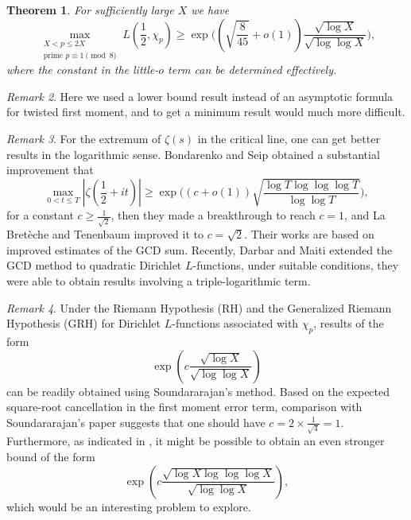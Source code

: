 \documentclass[12pt,reqno]{amsart}
\numberwithin{equation}{section}
\theoremstyle{plain}
\newtheorem{theorem}{Theorem}[section]
\theoremstyle{definition}
\theoremstyle{remark}
\newtheorem{remark}[theorem]{Remark}
\begin{document}
\begin{theorem}\label{thm1}
For sufficiently large $X$ we have
\begin{equation*}
  \max_{\substack{X< p\leq 2X\\\textrm{prime }p\equiv 1\pmod 8}}
  L(\frac{1}{2},\chi_p)
  \geq
\exp\Big((\sqrt{\frac{8}{45}}+o(1))\frac{\sqrt{\log X}}{\sqrt{\log\log X}}\Big),
\end{equation*}
where the constant in the little-$o$ term can be determined effectively.
\end{theorem}

\begin{remark}
  Here we used a lower bound result instead of an asymptotic formula for twisted first moment, and to get a minimum result would much more difficult.
\end{remark}

\begin{remark}
For the extremum of $\zeta(s)$ in the critical line, one can get better results in the logarithmic sense. Bondarenko and Seip\cite{BS17} obtained a substantial improvement that
\begin{equation*}
  \max_{0<t\leq T}|\zeta(\frac{1}{2}+it)|
  \geq \exp\Big(
  (c+o(1))\sqrt{\frac{\log T \log\log\log T}{\log \log T}}
  \Big),
\end{equation*}
for a constant $c\geq \frac{1}{\sqrt{2}}$,
then they made a breakthrough\cite{BS18} to reach $c = 1$, and La Bret\`eche and Tenenbaum\cite{dT19} improved it to $c=\sqrt{2}$.
Their works are based on improved estimates of the GCD sum.
Recently, Darbar and Maiti\cite{DM24,DM25} extended the GCD method to quadratic Dirichlet \( L \)-functions, under suitable conditions, they were able to obtain results involving a triple-logarithmic term.
\end{remark}

\begin{remark}
Under the Riemann Hypothesis (RH) and the Generalized Riemann Hypothesis (GRH) for Dirichlet \( L \)-functions associated with \( \chi_p \), results of the form
\[
\exp\left(c \frac{\sqrt{\log X}}{\sqrt{\log \log X}}\right)
\]
can be readily obtained using Soundararajan’s method.
Based on the expected square-root cancellation in the first moment error term, comparison with Soundararajan’s paper suggests that one should have \( c = 2 \times \frac{1}{\sqrt{4}} = 1 \).
Furthermore, as indicated in \cite{DM24,DM25},
it might be possible to obtain an even stronger bound of the form
\[
\exp\left(c \frac{\sqrt{\log X \log \log \log X}}{\sqrt{\log \log X}}\right),
\]
which would be an interesting problem to explore.
\end{remark}
\end{document}
